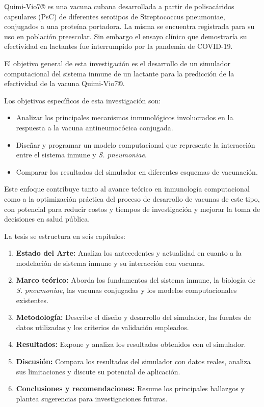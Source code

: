 Quimi-Vio7® es una vacuna cubana desarrollada a partir de polisacáridos capsulares (PsC) de diferentes serotipos de Streptococcus pneumoniae, conjugados a una proteína portadora. 
La misma se encuentra registrada para su uso en población preescolar. Sin embargo el ensayo clínico que demostraría su efectividad en lactantes fue interrumpido por la pandemia de COVID-19.


\vspace{0.5cm}

El objetivo general de esta investigación es el desarrollo de un simulador computacional del sistema inmune de un lactante para la predicción de la efectividad de la vacuna Quimi-Vio7®.

Los objetivos específicos de esta investigación son:
\begin{itemize}
    \item Analizar los principales mecanismos inmunológicos involucrados en la respuesta a la vacuna antineumocócica conjugada.
    \item Diseñar y programar un modelo computacional que represente la interacción entre el sistema inmune y \textit{S. pneumoniae}.
    
    \item Comparar los resultados del simulador en diferentes esquemas de vacunación.
\end{itemize}

Este enfoque contribuye tanto al avance teórico en inmunología computacional como a la optimización práctica del proceso de desarrollo de vacunas de este tipo, con potencial para reducir costos y tiempos de investigación y mejorar la toma de decisiones en salud pública.



\vspace{0.5cm}

La tesis se estructura en seis capítulos:
\begin{enumerate}
    \item \textbf{Estado del Arte:} Analiza los antecedentes y actualidad en cuanto a la modelación de sistema inmune y su interacción con vacunas.
    \item \textbf{Marco teórico:} Aborda los fundamentos del sistema inmune, la biología de \textit{S. pneumoniae}, las vacunas conjugadas y los modelos computacionales existentes.
    
    \item \textbf{Metodología:} Describe el diseño y desarrollo del simulador, las fuentes de datos utilizadas y los criterios de validación empleados.
    \item \textbf{Resultados:} Expone y analiza los resultados obtenidos con el simulador.
    \item \textbf{Discusión:} Compara los resultados del simulador con datos reales, analiza sus limitaciones y discute su potencial de aplicación.
    \item \textbf{Conclusiones y recomendaciones:} Resume los principales hallazgos y plantea sugerencias para investigaciones futuras.
\end{enumerate}